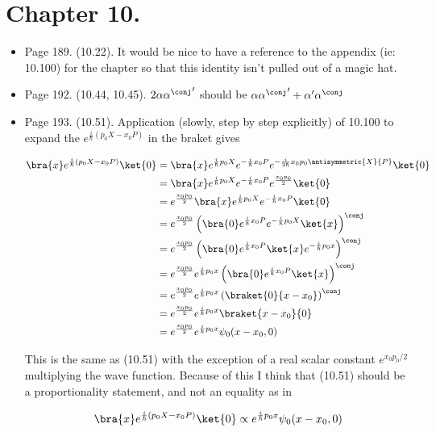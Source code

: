 \section{Chapter 10.}
\begin{itemize}
\item Page 189.  (10.22).  It would be nice to have a reference to the appendix (ie: 10.100) for the chapter so that this identity isn't pulled out of a magic hat.
\item Page 192.  (10.44, 10.45).  $2 \alpha {\alpha^\conj}'$ should be $\alpha {\alpha^\conj}' + \alpha' \alpha^\conj$
\item Page 193.  (10.51).  Application (slowly, step by step explicitly) of 10.100 to expand the $e^{\frac{i}{\hbar}(p_0 X - x_0 P)}$ in the braket gives

\begin{align*}
\bra{x} e^{\frac{i}{\hbar}(p_0 X - x_0 P)} \ket{0}
&=
\bra{x} e^{\frac{i}{\hbar}p_0 X }
e^{-\frac{i}{\hbar}x_0 P}
e^{-\frac{i}{2\hbar}x_0 p_0 \antisymmetric{X}{P}}
\ket{0} \\
&=
\bra{x} e^{\frac{i}{\hbar}p_0 X }
e^{-\frac{i}{\hbar}x_0 P}
e^{\frac{x_0 p_0}{2} }
\ket{0} \\
&=
e^{\frac{x_0 p_0}{2} }
\bra{x} e^{\frac{i}{\hbar}p_0 X} 
e^{-\frac{i}{\hbar}x_0 P}
\ket{0} \\
&=
e^{\frac{x_0 p_0}{2} }
\left(
\bra{0} 
e^{\frac{i}{\hbar}x_0 P}
e^{-\frac{i}{\hbar}p_0 X} 
\ket{x}\right)^\conj \\
&=
e^{\frac{x_0 p_0}{2} }
\left(
\bra{0} 
e^{\frac{i}{\hbar}x_0 P}
\ket{x}
e^{-\frac{i}{\hbar}p_0 x} 
\right)^\conj \\
&=
e^{\frac{x_0 p_0}{2} } e^{\frac{i}{\hbar}p_0 x} 
\left(
\bra{0} 
e^{\frac{i}{\hbar}x_0 P}
\ket{x}
\right)^\conj \\
&=
e^{\frac{x_0 p_0}{2} } e^{\frac{i}{\hbar}p_0 x} 
\left(
\braket{0}{x - x_0}
\right)^\conj \\
&=
e^{\frac{x_0 p_0}{2} } e^{\frac{i}{\hbar}p_0 x} 
\braket{x - x_0}{0} \\
&=
e^{\frac{x_0 p_0}{2} } e^{\frac{i}{\hbar}p_0 x} 
\psi_0(x - x_0, 0)
\end{align*}

This is the same as (10.51) with the exception of a real scalar constant $e^{ x_0 p_0/2}$ multiplying the wave function.  Because of this I think that (10.51) should be a proportionality statement, and not an equality as in

\begin{align*}
\bra{x} e^{\frac{i}{\hbar}(p_0 X - x_0 P)} \ket{0} \propto
e^{\frac{i}{\hbar}p_0 x} \psi_0(x - x_0, 0)
\end{align*}


\end{itemize}
